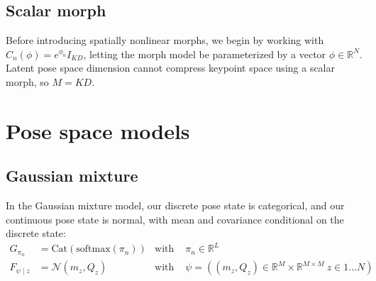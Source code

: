 \documentclass{article}         %
\newcommand{\RR}{\mathbb{R}}
\newcommand{\NN}{\mathcal{N}}
\begin{document}
\subsection{Scalar morph}

Before introducing spatially nonlinear morphs, we begin by working with $C_n(\phi) = e^{\phi_n} I_{KD}$, letting the morph model be parameterized by a vector $\phi \in \RR^N$. Latent pose space dimension cannot compress keypoint space using a scalar morph, so $M = KD$.


\section{Pose space models}



\subsection{Gaussian mixture}

In the Gaussian mixture model, our discrete pose state is categorical, and our continuous pose state is normal, with mean and covariance conditional on the discrete state:
\begin{align*}
    G_{\pi_n} &= \text{Cat}({\text{softmax}(\pi_n)}) & \text{with\ }&\pi_n \in \RR^L \\
    F_{\psi\mid z} &= \NN(m_z, Q_z) & \text{with\ }&\psi = ((m_z, Q_z) \in \RR^{M} \times \RR^{M\times M}\ z\in 1 ... N)
\end{align*}
\end{document}
